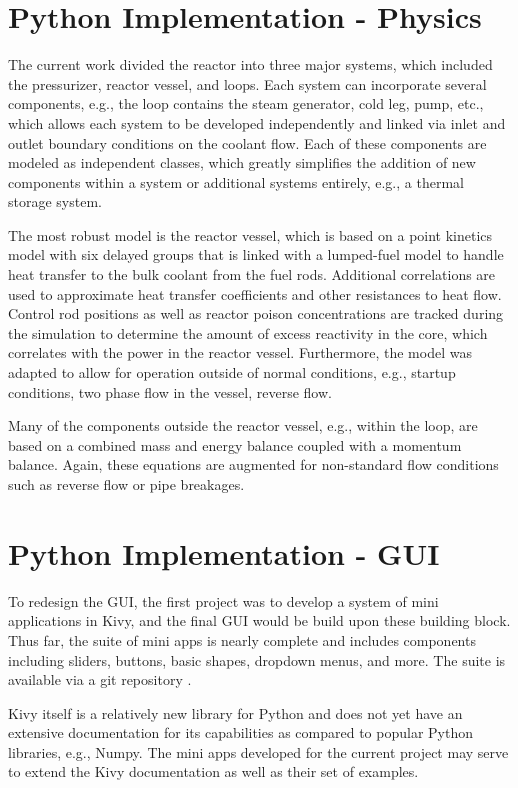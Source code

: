 \documentclass{anstrans}
\begin{document}
    \section{Python Implementation - Physics}
    The current work divided the reactor into three major systems, which included
    the pressurizer, reactor vessel, and loops.  Each system can incorporate several
    components, e.g., the loop contains the steam generator, cold leg, pump, etc.,
    which allows each system to be developed independently and linked via inlet
    and outlet boundary conditions on the coolant flow.  Each of these components
    are modeled as independent classes, which greatly simplifies the 
    addition of new components within a system or additional systems 
    entirely, e.g., a thermal storage system.
    
    The most robust model is the reactor vessel, which is based on a 
    point kinetics model with six delayed groups that is linked with a 
    lumped-fuel model to handle heat transfer to the bulk coolant from the fuel rods.
    Additional correlations
    are used to approximate heat transfer coefficients and other resistances to 
    heat flow.  Control rod positions as well as reactor poison concentrations are
    tracked during the simulation to determine the amount of excess reactivity in the core,
    which correlates with the power in the reactor vessel.  Furthermore, the model was adapted to allow for operation outside of normal 
    conditions, e.g., startup conditions, two phase flow in the vessel, reverse flow.
    
    Many of the components outside the reactor vessel, e.g., within the loop, are
    based on a combined mass and energy balance coupled with a momentum balance. Again,
    these equations are augmented for non-standard flow conditions such as reverse
    flow or pipe breakages.
    
    \section{Python Implementation - GUI}
    To redesign the GUI, the first project was to develop a system of mini applications
    in Kivy, and the final GUI would be build upon these building block.  Thus far,
    the suite of mini apps is nearly complete and 
    includes components including sliders, buttons, basic shapes, dropdown menus, 
    and more. The suite is available via a git repository \cite{kivyapps}. 
    
    Kivy itself is a relatively new library for Python and does not yet have
    an extensive documentation for its capabilities as compared to popular 
    Python libraries, e.g., Numpy.  The mini apps developed for the current 
    project may serve to extend the Kivy documentation as well as their set of examples.
    
\end{document}
